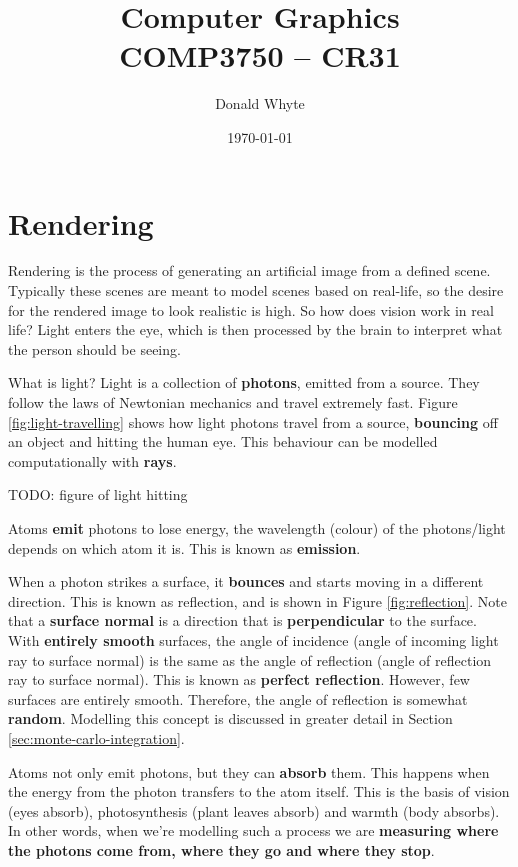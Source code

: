 \documentclass{article}
\title{Computer Graphics \\ COMP3750 -- CR31}
\author{Donald Whyte}
\date{\today}
\begin{document}
\maketitle

\tableofcontents

\pagebreak
\listoffigures

\pagebreak
\listoftables

\pagebreak

\section{Rendering}

Rendering is the process of generating an artificial image from a defined scene. Typically these scenes are meant to model scenes based on real-life, so the desire for the rendered image to look realistic is high. So how does vision work in real life? Light enters the eye, which is then processed by the brain to interpret what the person should be seeing.

What is light? Light is a collection of \textbf{photons}, emitted from a source. They follow the laws of Newtonian mechanics and travel extremely fast. Figure \ref{fig:light-travelling} shows how light photons travel from a source, \textbf{bouncing} off an object and hitting the human eye. This behaviour can be modelled computationally with \textbf{rays}.

TODO: figure of light hitting

Atoms \textbf{emit} photons to lose energy, the wavelength (colour) of the photons/light depends on which atom it is. This is known as \textbf{emission}.

When a photon strikes a surface, it \textbf{bounces} and starts moving in a different direction. This is known as reflection, and is shown in Figure \ref{fig:reflection}. Note that a \textbf{surface normal} is a direction that is \textbf{perpendicular} to the surface. With \textbf{entirely smooth} surfaces, the angle of incidence (angle of incoming light ray to surface normal) is the same as the angle of reflection (angle of reflection ray to surface normal). This is known as \textbf{perfect reflection}. However, few surfaces are entirely smooth. Therefore, the angle of reflection is somewhat \textbf{random}. Modelling this concept is discussed in greater detail in Section \ref{sec:monte-carlo-integration}.

Atoms not only emit photons, but they can \textbf{absorb} them. This happens when the energy from the photon transfers to the atom itself. This is the basis of vision (eyes absorb), photosynthesis (plant leaves absorb) and warmth (body absorbs). In other words, when we're modelling such a process we are \textbf{measuring where the photons come from, where they go and where they stop}.
\end{document}
